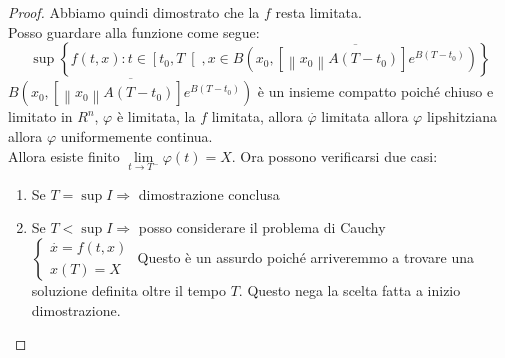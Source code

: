 \begin{proof}
	Abbiamo quindi dimostrato che la $f$ resta limitata.\\
	Posso guardare alla funzione come segue:\\
	$$
	\sup
	\left\{f(t,x): t\in\left[t_0,T\right[, x\in \overline{B\left(x_0,
		\left[ 
			\left\|x_0\right\| A \left(T-t_0\right)
		\right]e^{B\left(T-t_0\right)}\right)}
	\right\}
	$$
	$\overline{B\left(x_0,
		\left[ 
		\left\|x_0\right\| A \left(T-t_0\right)
		\right]e^{B\left(T-t_0\right)}\right)}
	$ è un insieme compatto poiché chiuso e limitato in $R^n$, $\varphi$ è limitata, la $f$ limitata, allora $\overset{\cdot}{\varphi}$ limitata allora $\varphi$ lipshitziana allora $\varphi$ uniformemente continua.\\
		Allora esiste finito $\lim\limits_{t\to T^{-}}\varphi(t)=X$. Ora possono verificarsi due casi:\\
	\begin{enumerate}
		\item Se $T=\sup I \Rightarrow$ dimostrazione conclusa
		\item Se $T<\sup I \Rightarrow$ posso considerare il problema di Cauchy \\
		$\left\{ \begin{matrix} \overset{\cdot}{x}=f(t,x)\\x(T)=X \end{matrix} \right.$ Questo è un assurdo poiché arriveremmo a trovare una soluzione definita oltre il tempo $T$. Questo nega la scelta fatta a inizio dimostrazione.
		\end{enumerate}
\end{proof}
